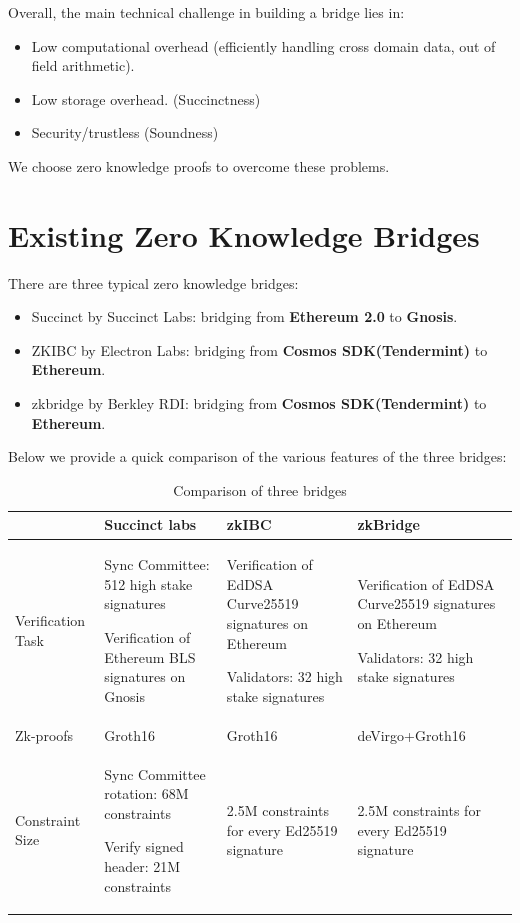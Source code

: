 \documentclass{article}
\begin{document}
Overall, the main technical challenge in building a bridge lies in:
\begin{itemize}
    \item Low computational overhead (efficiently handling cross domain data, out of field arithmetic).
    \item Low storage overhead. (Succinctness)
    \item Security/trustless (Soundness)
\end{itemize}


We choose zero knowledge proofs to overcome these problems.


\section{Existing Zero Knowledge Bridges}

There are three typical zero knowledge bridges:

\begin{itemize}
    \item Succinct by Succinct Labs: bridging from \textbf{Ethereum 2.0 }to \textbf{Gnosis}.
    \item ZKIBC by Electron Labs: bridging from \textbf{Cosmos SDK(Tendermint)} to \textbf{Ethereum}.
    \item zkbridge by Berkley RDI: bridging from \textbf{Cosmos SDK(Tendermint)} to \textbf{Ethereum}.
\end{itemize}

Below we provide a quick comparison of the various features of the three bridges:

\begin{table}[H]
    \centering
    \begin{tabular}{p{2cm}p{4cm}p{4cm}p{4cm}} \hline 
                        & Succinct labs & zkIBC &  zkBridge\\ \hline
         Verification Task   
         & Sync Committee: 512 high stake signatures

         Verification of Ethereum BLS signatures on Gnosis
         &  Verification of EdDSA Curve25519 signatures on Ethereum
         
         Validators: 32 high stake signatures
         & Verification of EdDSA Curve25519 signatures on Ethereum
         
         Validators: 32 high stake signatures
         

         \\ \hline
          Zk-proofs & Groth16 &Groth16 & deVirgo+Groth16 \\ \hline

         Constraint Size & 
         Sync Committee rotation: 68M constraints

         Verify signed header: 21M constraints
         &
         2.5M constraints for every Ed25519 signature
         
         & 2.5M constraints for every Ed25519 signature\\ \hline

      
    \end{tabular}
    \caption{Comparison of three bridges}
    \label{tab:my_label}
\end{table}
\end{document}
